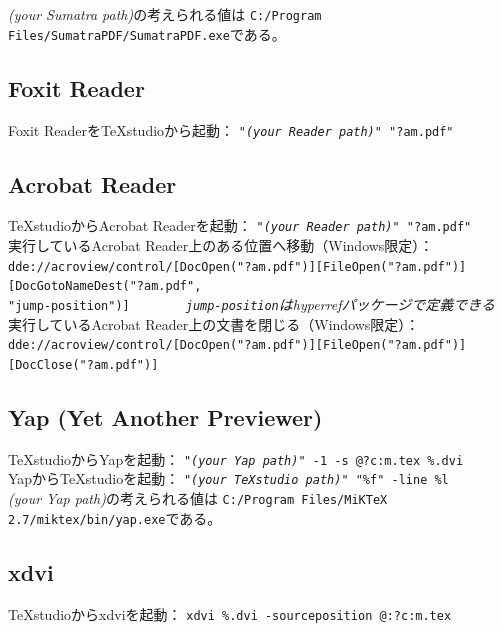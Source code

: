 \emph{(your Sumatra path)}の考えられる値は
\verb+C:/Program Files/SumatraPDF/SumatraPDF.exe+である。

\subsection{Foxit Reader}

Foxit ReaderをTeXstudioから起動：
 \texttt{"\emph{(your Reader path)"} "?am.pdf"}

\subsection{Acrobat Reader}

TeXstudioからAcrobat Readerを起動：
 \texttt{"\emph{(your Reader path)"} "?am.pdf"}\\


実行しているAcrobat Reader上のある位置へ移動（Windows限定）：\\
\texttt{dde://acroview/control/{[}DocOpen("?am.pdf"){]}{[}FileOpen("?am.pdf"){]}{[}DocGotoNameDest("?am.pdf",\\"jump-position"){]}}
~~ ~~ ~~\emph{\texttt{jump-position}はhyperrefパッケージで定義できる}\\


実行しているAcrobat Reader上の文書を閉じる（Windows限定）：\\
\texttt{dde://acroview/control/{[}DocOpen("?am.pdf"){]}{[}FileOpen("?am.pdf"){]}{[}DocClose("?am.pdf"){]}}

\subsection{Yap (Yet Another Previewer)}

TeXstudioからYapを起動：
 \texttt{"\emph{(your Yap path)}" -1 -s @?c:m.tex \%.dvi}\\

YapからTeXstudioを起動：
 \texttt{"\emph{(your TeXstudio path)}" "\%f" -line \%l}\\

\emph{(your Yap path)}の考えられる値は
\verb+C:/Program Files/MiKTeX 2.7/miktex/bin/yap.exe+である。

\subsection{xdvi}

TeXstudioからxdviを起動：
 \texttt{xdvi \%.dvi -sourceposition @:?c:m.tex}\\

